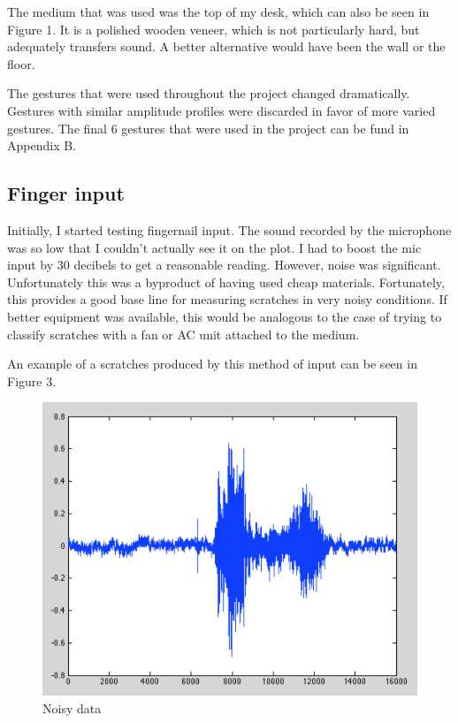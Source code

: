 \documentclass[12pt]{article}
\begin{document}
The medium that was used was the top of my desk, which can also be seen in Figure 1. It is a polished wooden veneer, which is not particularly hard, but adequately transfers sound. A better alternative would have been the wall or the floor.

The gestures that were used throughout the project changed dramatically. Gestures with similar amplitude profiles were discarded in favor of more varied gestures. The final 6 gestures that were used in the project can be fund in Appendix B.

\FloatBarrier

\subsection{Finger input}
Initially, I started testing fingernail input. The sound recorded by the microphone was so low that I couldn't actually see it on the plot. I had to boost the mic input by 30 decibels to get a reasonable reading. However, noise was significant. Unfortunately  this was a byproduct of having used cheap materials. Fortunately, this provides a good base line for measuring scratches in very noisy conditions. If better equipment was available, this would be analogous to the case of trying to classify scratches with a fan or AC unit attached to the medium.

An example of a scratches produced by this method of input can be seen in Figure 3.

\begin{figure}[h!]
\centering
\includegraphics[scale=0.7]{noisy.png}
\caption{Noisy data}
\end{figure}
\end{document}
